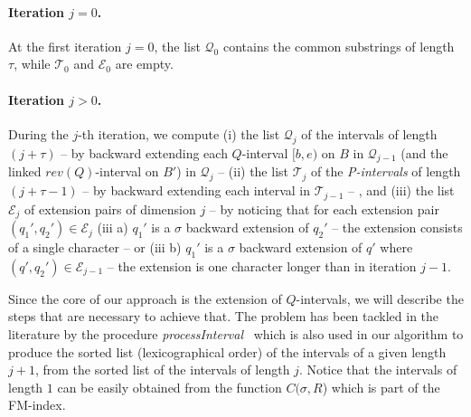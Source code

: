 \documentclass[runningheads,envcountsame,a4paper]{llncs}
\begin{document}
\paragraph{Iteration $j = 0$.}

At the first iteration $j=0$, the list $\mathcal{Q}_0$ contains the
common substrings of length $\tau$, while  $\mathcal{T}_0$ and $\mathcal{E}_0$ are empty.

\paragraph{Iteration $j > 0$.}
During the $j$-th iteration, we compute
(i) the list $\mathcal{Q}_{j}$ of the
intervals of length $(j+\tau)$  -- by backward extending each $Q$-interval $[b, e)$ on $B$ in $\mathcal{Q}_{j-1}$ (and the
linked $rev(Q)$-interval on $B'$) in $\mathcal{Q}_j$  --
(ii) the list $\mathcal{T}_{j}$ of the
\emph{P-intervals} of length $(j+\tau-1)$ -- by backward extending each interval
in $\mathcal{T}_{j-1}$   -- , and
(iii) the list $\mathcal{E}_j$ of
extension pairs of dimension $j$ -- by noticing that for each extension pair
$(q_{1}',q_{2}')\in \mathcal{E}_j$ (iii a) $q_{1}'$ is a $\sigma$ backward extension
of $q_{2}'$ -- the extension consists of a single character -- or  (iii b)
$q_{1}'$ is a $\sigma$ backward extension
of $q'$ where $(q',q_{2}')\in \mathcal{E}_{j-1}$ -- the extension is one
character longer than in iteration $j-1$.



Since the core of our approach is the extension of $Q$-intervals, we will
describe the steps that are necessary to achieve that.
The problem has been tackled in the literature by
the procedure \emph{processInterval}~\cite{Cox2012} which is also used in our algorithm to produce the sorted list
(lexicographical order) of the intervals of a given length $j+1$, from the
sorted list of the intervals of length $j$. Notice that the intervals of length $1$
can be easily obtained from the  function $C(\sigma, R$) which is part of the FM-index.
\end{document}
